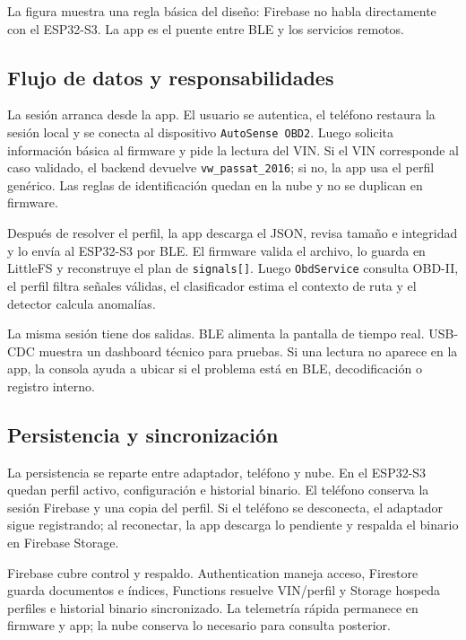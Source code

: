 \documentclass[12pt,letterpaper]{report}
\begin{document}
La figura muestra una regla básica del diseño: Firebase no habla directamente con el ESP32-S3. La app es el puente entre BLE y los servicios remotos.

\subsection{Flujo de datos y responsabilidades}

La sesión arranca desde la app. El usuario se autentica, el teléfono restaura la sesión local y se conecta al dispositivo \texttt{AutoSense OBD2}. Luego solicita información básica al firmware y pide la lectura del VIN. Si el VIN corresponde al caso validado, el backend devuelve \texttt{vw\_passat\_2016}; si no, la app usa el perfil genérico. Las reglas de identificación quedan en la nube y no se duplican en firmware.

Después de resolver el perfil, la app descarga el JSON, revisa tamaño e integridad y lo envía al ESP32-S3 por BLE. El firmware valida el archivo, lo guarda en LittleFS y reconstruye el plan de \texttt{signals[]}. Luego \texttt{ObdService} consulta OBD-II, el perfil filtra señales válidas, el clasificador estima el contexto de ruta y el detector calcula anomalías.

La misma sesión tiene dos salidas. BLE alimenta la pantalla de tiempo real. USB-CDC muestra un dashboard técnico para pruebas. Si una lectura no aparece en la app, la consola ayuda a ubicar si el problema está en BLE, decodificación o registro interno.

\subsection{Persistencia y sincronización}

La persistencia se reparte entre adaptador, teléfono y nube. En el ESP32-S3 quedan perfil activo, configuración e historial binario. El teléfono conserva la sesión Firebase y una copia del perfil. Si el teléfono se desconecta, el adaptador sigue registrando; al reconectar, la app descarga lo pendiente y respalda el binario en Firebase Storage.

Firebase cubre control y respaldo. Authentication maneja acceso, Firestore guarda documentos e índices, Functions resuelve VIN/perfil y Storage hospeda perfiles e historial binario sincronizado. La telemetría rápida permanece en firmware y app; la nube conserva lo necesario para consulta posterior.
\end{document}
